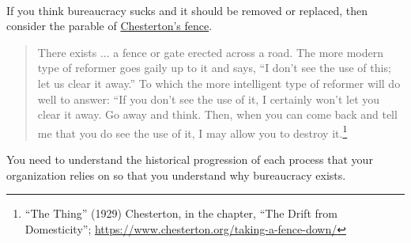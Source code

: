 \ \\

If you think bureaucracy sucks and it should be removed or replaced, then consider the parable of \href{https://en.wikipedia.org/wiki/G._K._Chesterton#Chesterton's_fence}{Chesterton's fence}. 
\begin{quote}
There exists ... a fence or gate erected across a road. The more modern type of reformer goes gaily up to it and says, “I don’t see the use of this; let us clear it away.” To which the more intelligent type of reformer will do well to answer: “If you don’t see the use of it, I certainly won’t let you clear it away. Go away and think. Then, when you can come back and tell me that you do see the use of it, I may allow you to destroy it.\footnote{``The Thing'' (1929) Chesterton, in the chapter, ``The Drift from Domesticity''; \href{https://www.chesterton.org/taking-a-fence-down/}{https://www.chesterton.org/taking-a-fence-down/}}
\end{quote}
You need to understand the historical progression of each process that your organization relies on so that you understand why bureaucracy exists.

